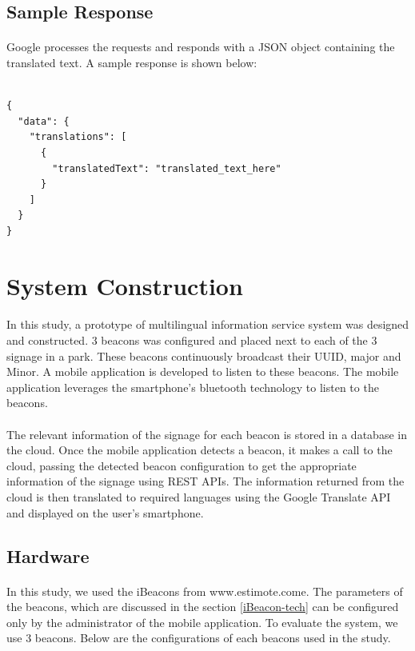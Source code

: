 \documentclass[12pt]{article}
\begin{document}
\subsection{Sample Response}

\paragraph{} Google processes the requests and responds with a JSON object containing the translated text. A sample response is shown below:

\begin{lstlisting}

{
  "data": {
    "translations": [
      {
        "translatedText": "translated_text_here"
      }
    ]
  }
}
\end{lstlisting}



\section{System Construction}
\label{system}
\paragraph{}In this study, a prototype of multilingual information service system was designed and constructed. 3 beacons was configured and placed next to each of the 3 signage in a park. These beacons continuously broadcast their UUID, major and Minor. A mobile application is developed to listen to these beacons. The mobile application leverages the smartphone’s bluetooth technology to listen to the beacons.

\paragraph{}The relevant information of the signage for each beacon is stored in a database in the cloud. Once the mobile application detects a beacon, it makes a call to the cloud, passing the detected beacon configuration to get the appropriate information of the signage using REST APIs. The information returned from the cloud is then translated to required languages using the Google Translate API and displayed on the user’s smartphone.

\subsection{Hardware}
\paragraph{}In this study, we used the iBeacons from www.estimote.come. The parameters of the beacons, which are discussed in the section \ref{iBeacon-tech} can be configured only by the administrator of the mobile application. To evaluate the system, we use 3 beacons. Below are the configurations of each beacons used in the study.
\end{document}
